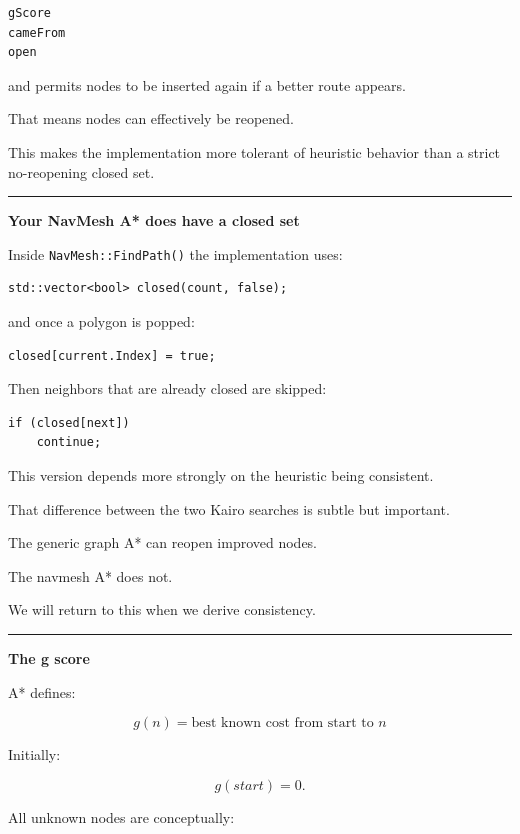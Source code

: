 \begin{verbatim}
gScore
cameFrom
open
\end{verbatim}

and permits nodes to be inserted again if a better route appears.

That means nodes can effectively be reopened.

This makes the implementation more tolerant of heuristic behavior than a strict no-reopening closed set.

\begin{center}\rule{0.5\linewidth}{0.5pt}\end{center}

\textbf{Your NavMesh A* does have a closed set}

Inside \texttt{NavMesh::FindPath()} the implementation uses:

\begin{verbatim}
std::vector<bool> closed(count, false);
\end{verbatim}

and once a polygon is popped:

\begin{verbatim}
closed[current.Index] = true;
\end{verbatim}

Then neighbors that are already closed are skipped:

\begin{verbatim}
if (closed[next])
    continue;
\end{verbatim}

This version depends more strongly on the heuristic being consistent.

That difference between the two Kairo searches is subtle but important.

The generic graph A* can reopen improved nodes.

The navmesh A* does not.

We will return to this when we derive consistency.

\begin{center}\rule{0.5\linewidth}{0.5pt}\end{center}

\textbf{The g score}

A* defines:

\[
\boxed{
g(n)
=
\text{best known cost from start to }n
}
\]

Initially:

\[
g(start)=0.
\]

All unknown nodes are conceptually:

